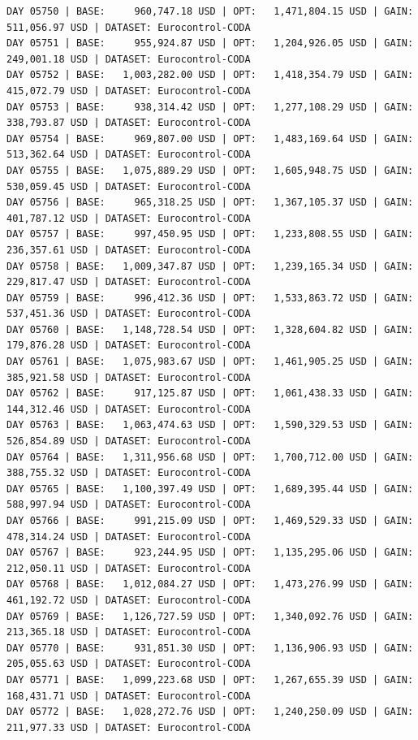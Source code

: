 \documentclass[11pt,a4paper]{article}
\begin{document}
\begin{verbatim}
DAY 05750 | BASE:     960,747.18 USD | OPT:   1,471,804.15 USD | GAIN: 511,056.97 USD | DATASET: Eurocontrol-CODA
DAY 05751 | BASE:     955,924.87 USD | OPT:   1,204,926.05 USD | GAIN: 249,001.18 USD | DATASET: Eurocontrol-CODA
DAY 05752 | BASE:   1,003,282.00 USD | OPT:   1,418,354.79 USD | GAIN: 415,072.79 USD | DATASET: Eurocontrol-CODA
DAY 05753 | BASE:     938,314.42 USD | OPT:   1,277,108.29 USD | GAIN: 338,793.87 USD | DATASET: Eurocontrol-CODA
DAY 05754 | BASE:     969,807.00 USD | OPT:   1,483,169.64 USD | GAIN: 513,362.64 USD | DATASET: Eurocontrol-CODA
DAY 05755 | BASE:   1,075,889.29 USD | OPT:   1,605,948.75 USD | GAIN: 530,059.45 USD | DATASET: Eurocontrol-CODA
DAY 05756 | BASE:     965,318.25 USD | OPT:   1,367,105.37 USD | GAIN: 401,787.12 USD | DATASET: Eurocontrol-CODA
DAY 05757 | BASE:     997,450.95 USD | OPT:   1,233,808.55 USD | GAIN: 236,357.61 USD | DATASET: Eurocontrol-CODA
DAY 05758 | BASE:   1,009,347.87 USD | OPT:   1,239,165.34 USD | GAIN: 229,817.47 USD | DATASET: Eurocontrol-CODA
DAY 05759 | BASE:     996,412.36 USD | OPT:   1,533,863.72 USD | GAIN: 537,451.36 USD | DATASET: Eurocontrol-CODA
DAY 05760 | BASE:   1,148,728.54 USD | OPT:   1,328,604.82 USD | GAIN: 179,876.28 USD | DATASET: Eurocontrol-CODA
DAY 05761 | BASE:   1,075,983.67 USD | OPT:   1,461,905.25 USD | GAIN: 385,921.58 USD | DATASET: Eurocontrol-CODA
DAY 05762 | BASE:     917,125.87 USD | OPT:   1,061,438.33 USD | GAIN: 144,312.46 USD | DATASET: Eurocontrol-CODA
DAY 05763 | BASE:   1,063,474.63 USD | OPT:   1,590,329.53 USD | GAIN: 526,854.89 USD | DATASET: Eurocontrol-CODA
DAY 05764 | BASE:   1,311,956.68 USD | OPT:   1,700,712.00 USD | GAIN: 388,755.32 USD | DATASET: Eurocontrol-CODA
DAY 05765 | BASE:   1,100,397.49 USD | OPT:   1,689,395.44 USD | GAIN: 588,997.94 USD | DATASET: Eurocontrol-CODA
DAY 05766 | BASE:     991,215.09 USD | OPT:   1,469,529.33 USD | GAIN: 478,314.24 USD | DATASET: Eurocontrol-CODA
DAY 05767 | BASE:     923,244.95 USD | OPT:   1,135,295.06 USD | GAIN: 212,050.11 USD | DATASET: Eurocontrol-CODA
DAY 05768 | BASE:   1,012,084.27 USD | OPT:   1,473,276.99 USD | GAIN: 461,192.72 USD | DATASET: Eurocontrol-CODA
DAY 05769 | BASE:   1,126,727.59 USD | OPT:   1,340,092.76 USD | GAIN: 213,365.18 USD | DATASET: Eurocontrol-CODA
DAY 05770 | BASE:     931,851.30 USD | OPT:   1,136,906.93 USD | GAIN: 205,055.63 USD | DATASET: Eurocontrol-CODA
DAY 05771 | BASE:   1,099,223.68 USD | OPT:   1,267,655.39 USD | GAIN: 168,431.71 USD | DATASET: Eurocontrol-CODA
DAY 05772 | BASE:   1,028,272.76 USD | OPT:   1,240,250.09 USD | GAIN: 211,977.33 USD | DATASET: Eurocontrol-CODA

\end{verbatim}
\end{document}

